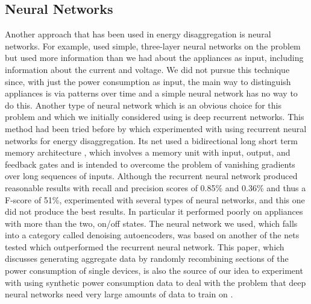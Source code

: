 \documentclass{article}
\begin{document}



\subsection{Neural Networks}
Another approach that has been used in energy disaggregation is neural networks. For example, \cite{Ruzzelli} used simple, three-layer neural networks on the problem but used more information than we had about the appliances as input, including information about the current and voltage. We did not pursue this technique since, with just the power consumption as input, the main way to distinguish appliances is via patterns over time and a simple neural network has no way to do this. Another type of neural network which is an obvious choice for this problem and which we initially considered using is deep recurrent networks. This method had been tried  before by \cite{Kelly} which experimented with using recurrent neural networks for energy disaggregation. Its net used a bidirectional long short term memory architecture \cite{Kelly}, which involves a memory unit with input, output, and feedback gates and is intended to overcome the problem of vanishing gradients over long sequences of inputs. Although the recurrent neural network produced reasonable results with recall and precision scores of 0.85\% and 0.36\% and thus a F-score of 51\%, \cite{Kelly} experimented with several types of neural networks, and this one did not produce the best results. In particular it performed poorly on appliances with more than the two, on/off states. The neural network we used, which falls into a category called denoising autoencoders, was based on another of the nets \cite{Kelly} tested which outperformed the recurrent neural network. This paper, which discusses generating aggregate data by randomly recombining sections of the power consumption of single devices, is also the source of our idea to experiment with using synthetic power consumption data to deal with the problem that deep neural networks need very large amounts of data to train on \cite{Kelly}.
\end{document}
